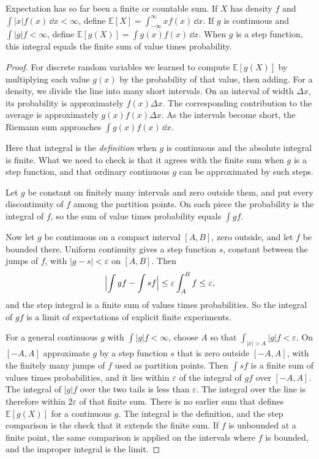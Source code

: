 \begin{proposition}\label{prop:densitymean}
Expectation has so far been a finite or countable sum. If $X$ has density $f$ and $\int |x|f(x)\,\dd x<\infty$, define $\mathbb E[X]=\int_{-\infty}^{\infty} x f(x)\,\dd x$. If $g$ is continuous and $\int |g|f<\infty$, define $\mathbb E[g(X)]=\int g(x)f(x)\,\dd x$. When $g$ is a step function, this integral equals the finite sum of value times probability.
\end{proposition}
\begin{proof}
For discrete random variables we learned to compute $\mathbb E[g(X)]$ by multiplying each value $g(x)$ by the probability of that value, then adding. For a density, we divide the line into many short intervals. On an interval of width $\Delta x$, its probability is approximately $f(x)\Delta x$. The corresponding contribution to the average is approximately $g(x)f(x)\Delta x$. As the intervals become short, the Riemann sum approaches $\int g(x)f(x)\,\dd x$.

Here that integral is the \emph{definition} when $g$ is continuous and the absolute integral is finite. What we need to check is that it agrees with the finite sum when $g$ is a step function, and that ordinary continuous $g$ can be approximated by such steps.

Let $g$ be constant on finitely many intervals and zero outside them, and put every discontinuity of $f$ among the partition points. On each piece the probability is the integral of $f$, so the sum of value times probability equals $\int g f$.

Now let $g$ be continuous on a compact interval $[A,B]$, zero outside, and let $f$ be bounded there. Uniform continuity gives a step function $s$, constant between the jumps of $f$, with $|g-s|<\varepsilon$ on $[A,B]$. Then
\[
 \Bigl|\int g f-\int s f\Bigr|\le\varepsilon\int_A^B f\le\varepsilon,
\]
and the step integral is a finite sum of values times probabilities. So the integral of $g f$ is a limit of expectations of explicit finite experiments.

For a general continuous $g$ with $\int|g|f<\infty$, choose $A$ so that $\int_{|x|>A}|g|f<\varepsilon$. On $[-A,A]$ approximate $g$ by a step function $s$ that is zero outside $[-A,A]$, with the finitely many jumps of $f$ used as partition points. Then $\int s f$ is a finite sum of values times probabilities, and it lies within $\varepsilon$ of the integral of $g f$ over $[-A,A]$. The integral of $|g|f$ over the two tails is less than $\varepsilon$. The integral over the line is therefore within $2\varepsilon$ of that finite sum. There is no earlier sum that defines $\mathbb E[g(X)]$ for a continuous $g$. The integral is the definition, and the step comparison is the check that it extends the finite sum. If $f$ is unbounded at a finite point, the same comparison is applied on the intervals where $f$ is bounded, and the improper integral is the limit.
\end{proof}

